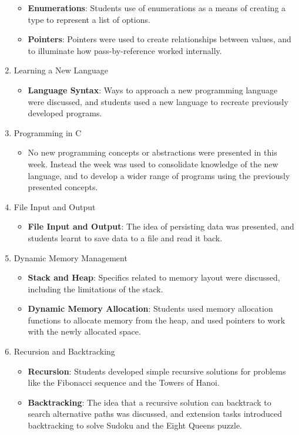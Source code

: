 \begin{enumerate}
\begin{itemize}[noitemsep,nolistsep]
  	\item \textbf{Enumerations}: Students use of enumerations as a means of creating a type to represent a list of options.
  	\item \textbf{Pointers}: Pointers were used to create relationships between values, and to illuminate how pass-by-reference worked internally.
  \end{itemize}
  \item Learning a New Language
  \begin{itemize}[noitemsep,nolistsep]
  	\item \textbf{Language Syntax}: Ways to approach a new programming language were discussed, and students used a new language to recreate previously developed programs.
  \end{itemize}
  \item Programming in C
  \begin{itemize}[noitemsep,nolistsep]
  	\item No new programming concepts or abstractions were presented in this week. Instead the week was used to consolidate knowledge of the new language, and to develop a wider range of programs using the previously presented concepts.
  \end{itemize}
  \item File Input and Output
  \begin{itemize}[noitemsep,nolistsep]
  	\item \textbf{File Input and Output}: The idea of persisting data was presented, and students learnt to save data to a file and read it back. 
  \end{itemize}

  \item Dynamic Memory Management
  \begin{itemize}[noitemsep,nolistsep]
  	\item \textbf{Stack and Heap}: Specifics related to memory layout were discussed, including the limitations of the stack.
  	\item \textbf{Dynamic Memory Allocation}: Students used memory allocation functions to allocate memory from the heap, and used pointers to work with the newly allocated space.
  \end{itemize}

  \item Recursion and Backtracking
  \begin{itemize}[noitemsep,nolistsep]
  	\item \textbf{Recursion}: Students developed simple recursive solutions for problems like the Fibonacci sequence and the Towers of Hanoi.
  	\item \textbf{Backtracking}: The idea that a recursive solution can backtrack to search alternative paths was discussed, and extension tasks introduced backtracking to solve Sudoku and the Eight Queens puzzle.
  \end{itemize}


\end{enumerate}
